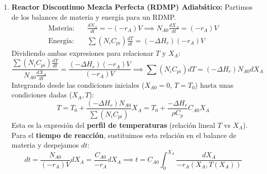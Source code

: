 \solve{}
\begin{enumerate}[label=\alph*)]
	\item \textbf{Reactor Discontinuo Mezcla Perfecta (RDMP) Adiabático:}
	      Partimos de los balances de materia y energía para un RDMP.
	      \begin{align*}
		      \text{Materia:} & \quad \frac{dN_A}{dt} = -(-r_A) V \implies N_{A0} \frac{dX_A}{dt} = (-r_A) V \\
		      \text{Energía:} & \quad \sum (N_i C_{pi}) \frac{dT}{dt} = (-\Delta H_r) (-r_A) V
	      \end{align*}
	      Dividiendo ambas expresiones para relacionar $T$ y $X_A$:
	      \begin{equation*}
		      \frac{\sum (N_i C_{pi}) \frac{dT}{dt}}{N_{A0} \frac{dX_A}{dt}} = \frac{(-\Delta H_r) (-r_A) V}{(-r_A) V} \implies \sum (N_i C_{pi}) dT = (-\Delta H_r) N_{A0} dX_A
	      \end{equation*}
	      Integrando desde las condiciones iniciales ($X_{A0}=0$, $T=T_0$) hasta unas condiciones dadas ($X_A, T$):
	      \begin{equation*}
		      T = T_0 + \frac{(-\Delta H_r) N_{A0}}{\sum (N_i C_{pi})} X_A = T_0 + \frac{-\Delta H_r}{\rho C_p} C_{A0} X_A
	      \end{equation*}
	      Esta es la expresión del \textbf{perfil de temperaturas} (relación lineal $T$ vs $X_A$).
	      Para el \textbf{tiempo de reacción}, sustituimos esta relación en el balance de materia y despejamos $dt$:
	      \begin{equation*}
		      dt = \frac{N_{A0}}{(-r_A) V} dX_A = \frac{C_{A0}}{-r_A} dX_A \implies t = C_{A0} \int_0^{X_A} \frac{dX_A}{-r_A(X_A, T(X_A))}
	      \end{equation*}


\end{enumerate}
